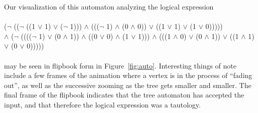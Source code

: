 \documentclass{article}
\begin{document}
Our visualization of this automaton analyzing the logical expression \\
~\\
($\lnot$ (($\lnot$ ((1 $\lor$ 1) $\lor$ ($\lnot$ 1))) $\land$ ((($\lnot$ 1) $\land$ (0 $\land$ 0)) $\lor$ ((1 $\lor$ 1) $\lor$ (1 $\lor$ 0))))) \\
$\land$ ($\lnot$ (((($\lnot$ 1) $\lor$ (0 $\land$ 1)) $\land$ ((0 $\lor$ 0) $\land$ (1 $\lor$ 1))) $\land$ (((1 $\land$ 0) $\lor$ (0 $\land$ 1)) $\lor$ ((1 $\land$ 1) $\lor$ (0 $\lor$ 0)))))\\
~\\
may be seen in flipbook form in Figure~\ref{fig:auto}.  Interesting things of note include a few frames of the animation where a vertex is in the process of ``fading out'', as well as the successive zooming as the tree gets smaller and smaller.  The final frame of the flipbook indicates that the tree automaton has accepted the input, and that therefore the logical expression was a tautology.
\end{document}
